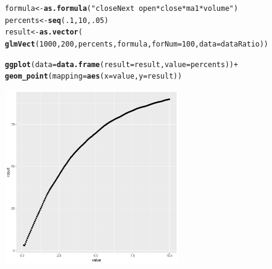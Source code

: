 \documentclass{article}\usepackage[]{graphicx}\usepackage[]{color}
\makeatletter
\newcommand{\hlnum}[1]{\textcolor[rgb]{0.686,0.059,0.569}{#1}}%
\newcommand{\hlstr}[1]{\textcolor[rgb]{0.192,0.494,0.8}{#1}}%
\newcommand{\hlopt}[1]{\textcolor[rgb]{0,0,0}{#1}}%
\newcommand{\hlstd}[1]{\textcolor[rgb]{0.345,0.345,0.345}{#1}}%
\newcommand{\hlkwb}[1]{\textcolor[rgb]{0.69,0.353,0.396}{#1}}%
\newcommand{\hlkwc}[1]{\textcolor[rgb]{0.333,0.667,0.333}{#1}}%
\newcommand{\hlkwd}[1]{\textcolor[rgb]{0.737,0.353,0.396}{\textbf{#1}}}%
\newenvironment{kframe}{%
 \def\at@end@of@kframe{}%
 \ifinner\ifhmode%
  \def\at@end@of@kframe{\end{minipage}}%
  \begin{minipage}{\columnwidth}%
 \fi\fi%
 \def\FrameCommand##1{\hskip\@totalleftmargin \hskip-\fboxsep
 \colorbox{shadecolor}{##1}\hskip-\fboxsep
     \hskip-\linewidth \hskip-\@totalleftmargin \hskip\columnwidth}%
 \MakeFramed {\advance\hsize-\width
   \@totalleftmargin\z@ \linewidth\hsize
   \@setminipage}}%
 {\par\unskip\endMakeFramed%
 \at@end@of@kframe}
\newenvironment{knitrout}{}{} %
\makeatother
\begin{document}
\begin{knitrout}
\color{fgcolor}\begin{kframe}
\begin{alltt}
\hlstd{formula} \hlkwb{<-} \hlkwd{as.formula}\hlstd{(}\hlstr{"closeNext~open*close*ma1*volume"}\hlstd{)}
\hlstd{percents} \hlkwb{<-} \hlkwd{seq}\hlstd{(}\hlnum{.1}\hlstd{,}\hlnum{10}\hlstd{,}\hlnum{.05}\hlstd{)}
\hlstd{result} \hlkwb{<-} \hlkwd{as.vector}\hlstd{(}
  \hlkwd{glmVect}\hlstd{(}\hlnum{1000}\hlstd{,}\hlnum{200}\hlstd{,percents,formula,}\hlkwc{forNum}\hlstd{=}\hlnum{100}\hlstd{,}\hlkwc{data}\hlstd{=dataRatio))}
\end{alltt}
\end{kframe}
\end{knitrout}
\begin{center}
\begin{knitrout}
\color{fgcolor}\begin{kframe}
\begin{alltt}
\hlkwd{ggplot}\hlstd{(}\hlkwc{data}\hlstd{=}\hlkwd{data.frame}\hlstd{(}\hlkwc{result}\hlstd{=result,}\hlkwc{value}\hlstd{=percents))} \hlopt{+}
  \hlkwd{geom_point}\hlstd{(}\hlkwc{mapping} \hlstd{=} \hlkwd{aes}\hlstd{(}\hlkwc{x}\hlstd{=value,}\hlkwc{y}\hlstd{=result))}
\end{alltt}
\end{kframe}
\includegraphics[width=3in,height=3in]{figure/unnamed-chunk-15-1} 

\end{knitrout}
\end{center}
\end{document}

